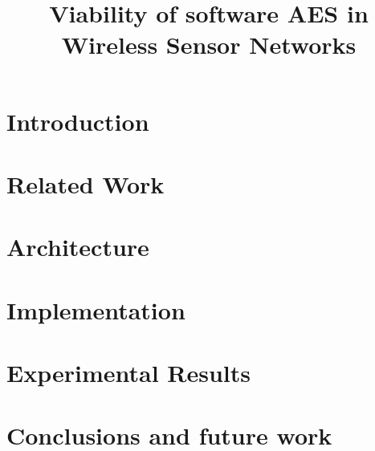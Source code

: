 \documentclass[conference]{IEEEtran}
\begin{document}
\title{Viability of software AES in Wireless Sensor Networks}

\author{
}

\maketitle

\begin{abstract} 

\end{abstract}

\section{Introduction}
\label{sec:introduction}


\section{Related Work}
\label{sec:related}


\section{Architecture}
\label{sec:architecture}


\section{Implementation}
\label{sec:implementation}


\section{Experimental Results}
\label{sec:results}


\section{Conclusions and future work}
\label{sec:conclusions}




\end{document}
